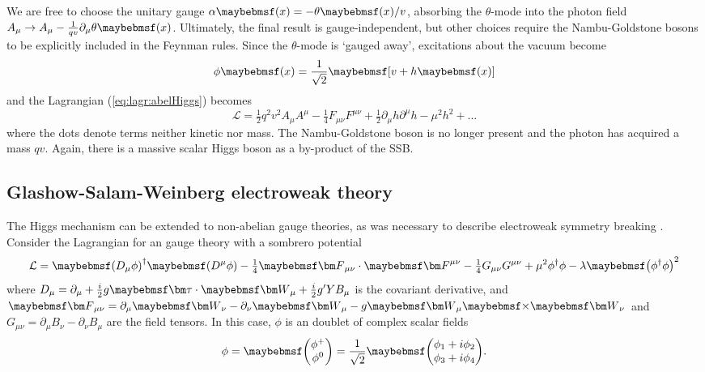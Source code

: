 We are free to choose the unitary gauge $\alpha\parenths{x} = -\theta\parenths{x}/v$,
absorbing the $\theta$-mode into the photon field 
$A_{\mu} \rightarrow A_{\mu} - \tfrac{1}{qv}\partial_{\mu} \theta\parenths{x}$. 
Ultimately, the final result is gauge-independent, but other choices require the 
Nambu-Goldstone bosons to be explicitly included in the Feynman rules. Since the 
$\theta$-mode is `gauged away', excitations about the vacuum become
\begin{equation}
	\phi\parenths{x} = \frac{1}{\sqrt{2}} \sqbracs{v + h\parenths{x}}
\end{equation}
and the Lagrangian (\ref{eq:lagr:abelHiggs}) becomes
\begin{equation}
	\mathcal{L}
	= \tfrac{1}{2} q^2 v^2 A_{\mu} A^{\mu}
	- \tfrac{1}{4} F_{\mu\nu}F^{\mu\nu}
	+ \tfrac{1}{2} \partial_{\mu}h \partial^{\mu}h
	- \mu^2 h^2
	+ \dots
\end{equation}
where the dots denote terms neither kinetic nor mass. 
The Nambu-Goldstone boson is no longer present and the photon has acquired a mass $qv$.
Again, there is a massive scalar Higgs boson as a by-product of the \ac{SSB}.



\subsection{Glashow-Salam-Weinberg electroweak theory}
The Higgs mechanism can be extended to non-abelian gauge theories, as was necessary to 
describe electroweak symmetry breaking \cite{Kibble:1967,Weinberg:1967,Salam:1968}.
Consider the Lagrangian for an \cross{} gauge theory with a sombrero
potential
\begin{equation}
	\mathcal{L} 
	= \parenths{D_{\mu}\phi}^{\dagger} \parenths{D^{\mu}\phi}
	- \tfrac{1}{4} \bvec{F}_{\mu\nu} \cdot \bvec{F}^{\mu\nu}
	- \tfrac{1}{4} G_{\mu\nu} G^{\mu\nu}
	+ \mu^2 \phi^{\dagger} \phi - \lambda \parenths{\phi^{\dagger} \phi}^2
	\label{eq:lagr:ewHiggs}
\end{equation}
where $D_{\mu} = \partial_{\mu} + \tfrac{i}{2} g \bvec{\tau} \cdot \bvec{W}_{\mu} + 
\tfrac{i}{2} g' Y B_{\mu}$ is the covariant derivative, and $\bvec{F}_{\mu\nu} = 
\partial_{\mu}\bvec{W}_{\nu} - \partial_{\nu}\bvec{W}_{\mu} - g \bvec{W}_{\mu} \cross 
\bvec{W}_{\nu}$ and $G_{\mu\nu} = \partial_{\mu}B_{\nu} - \partial_{\nu}B_{\mu}$ are the
field tensors. In this case, $\phi$ is an  doublet of complex scalar fields
\begin{equation}
	\phi = \colvector{\phi^+\\\phi^0} = \frac{1}{\sqrt{2}} \colvector{ \phi_1 + i\phi_2\\ \phi_3 + i\phi_4}.
\end{equation}

